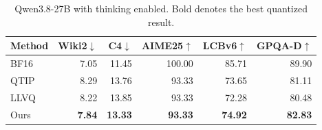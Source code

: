 \begin{table}[t]\centering\small
\caption{
Qwen3.8-27B with thinking enabled. Bold denotes the best quantized result.
}
\label{tab:qwen38}
\begin{tabular}{lrrrrr}\toprule
Method & Wiki2$\downarrow$ & C4$\downarrow$ & AIME25$\uparrow$ & LCBv6$\uparrow$ & GPQA-D$\uparrow$\\\midrule
BF16 & 7.05 & 11.45 & 100.00 & 85.71 & 89.90\\
QTIP & 8.29 & 13.76 & 93.33 & 73.65 & 81.11\\
LLVQ & 8.22 & 13.85 & 93.33 & 72.28 & 80.48\\
Ours & \textbf{7.84} & \textbf{13.33} & \textbf{93.33} & \textbf{74.92} & \textbf{82.83}\\\bottomrule
\end{tabular}\end{table}
